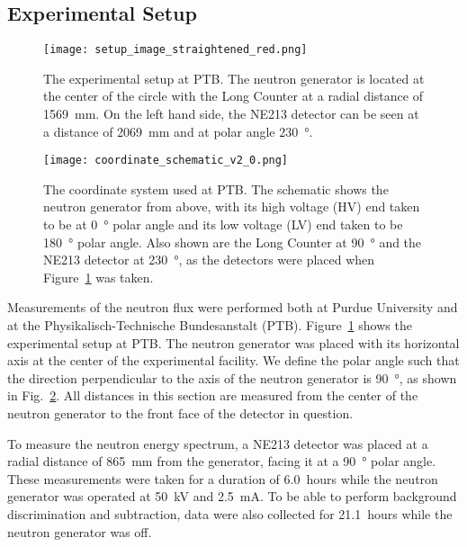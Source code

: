 \subsection{Experimental Setup}

\begin{figure}[!htb]
\centering
\texttt{[image: setup\_image\_straightened\_red.png]}
\caption{The experimental setup at PTB. The neutron generator is located at the center of the circle with the Long Counter at a radial distance of \SI{1569}{mm}. On the left hand side, the NE213 detector can be seen at a distance of \SI{2069}{mm} and at polar angle \SI{230}{\degree}.}
\label{fig:ptb_setup}
\end{figure}

\begin{figure}[!htb]
\centering
\texttt{[image: coordinate\_schematic\_v2\_0.png]} %
\caption{The coordinate system used at PTB. The schematic shows the neutron generator from above, with its high voltage  (HV) end taken to be at \SI{0}{\degree} polar angle and its low voltage (LV) end taken to be \SI{180}{\degree} polar angle. Also shown are the Long Counter at \SI{90}{\degree} and the NE213 detector at \SI{230}{\degree}, as the detectors were placed when Figure~\ref{fig:ptb_setup} was taken.}
\label{fig:ptb_coordinates}
\end{figure}

Measurements of the neutron flux were performed both at Purdue University and at the Physikalisch-Technische Bundesanstalt (PTB). Figure~\ref{fig:ptb_setup} shows the experimental setup at PTB. The neutron generator was placed with its horizontal axis at the center of the experimental facility. We define the polar angle such that the direction perpendicular to the axis of the neutron generator is \SI{90}{\degree}, as shown in Fig.~\ref{fig:ptb_coordinates}. All distances in this section are measured from the center of the neutron generator to the front face of the detector in question.

To measure the neutron energy spectrum, a NE213 detector was placed at a radial distance of \SI{865}{mm} from the generator, facing it at a \SI{90}{\degree} polar angle. These measurements were taken for a duration of \SI{6.0}{hours} while the neutron generator was operated at \SI{50}{kV} and \SI{2.5}{mA}. To be able to perform background discrimination and subtraction, data were also collected for \SI{21.1}{hours} while the neutron generator was off.

